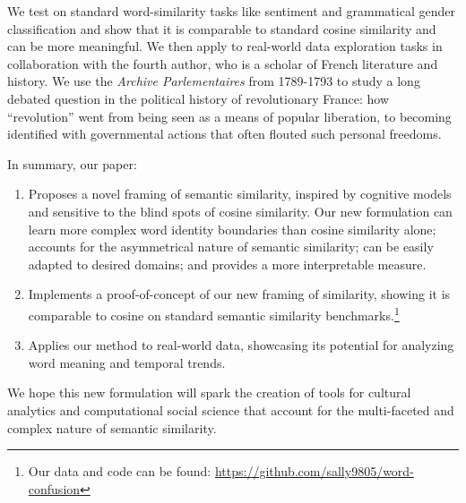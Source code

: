 We test \wc on standard word-similarity tasks like sentiment and grammatical gender classification and show that it is comparable to standard cosine similarity and can be more meaningful. We then apply \wc to real-world data exploration tasks in collaboration with the fourth author, who is a scholar of French literature and history. We use the {\em Archive Parlementaires} from 1789-1793 to study a long debated question in the political history of revolutionary France: how ``revolution'' went from being seen as a means of popular liberation, to becoming identified with governmental actions that often flouted such personal freedoms. 


\noindent In summary, our paper:
\begin{enumerate}[itemsep=0pt]
   \item Proposes a novel framing of semantic similarity, inspired by cognitive models and sensitive to the blind spots of cosine similarity. Our new formulation can learn more complex word identity boundaries than cosine similarity alone; accounts for the asymmetrical nature of semantic similarity; can be easily adapted to desired domains; and provides a more interpretable measure. 
   \item Implements a proof-of-concept of our new framing of similarity, showing it is comparable to cosine on standard semantic similarity benchmarks.\footnote{Our data and code can be found: \url{https://github.com/sally9805/word-confusion}}
   \item Applies our method to real-world data, showcasing its potential for analyzing word meaning and temporal trends.
\end{enumerate}

We hope this new formulation will spark the creation of tools for cultural analytics and computational social science that account for the multi-faceted and complex nature of semantic similarity.  

